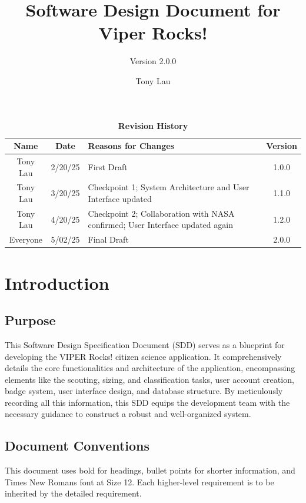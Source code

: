 \documentclass{article}
\begin{document}
\title{Software Design Document for Viper Rocks!}
\author{Version 2.0.0}
\date{Tony Lau}

\maketitle
\tableofcontents
\newpage

\fancyhf{}
\fancyfoot[C]{\thepage}

\begin{table}[h!]
\centering
\caption{\textbf{Revision History}}
\begin{tabularx}{\textwidth}{|c|c|X|c|}
\hline
\textbf{Name} & \textbf{Date} & \textbf{Reasons for Changes} & \textbf{Version} \\
\hline
Tony Lau & 2/20/25 & First Draft & 1.0.0 \\
\hline
Tony Lau & 3/20/25 & Checkpoint 1; System Architecture and User Interface updated & 1.1.0 \\
\hline
Tony Lau & 4/20/25 & Checkpoint 2; Collaboration with NASA confirmed; User Interface updated again & 1.2.0 \\
\hline
Everyone & 5/02/25 & Final Draft & 2.0.0 \\
\hline
\end{tabularx}
\end{table}

\section{Introduction}
\subsection{Purpose}
This Software Design Specification Document (SDD) serves as a blueprint for developing the VIPER Rocks! citizen science application. It comprehensively details the core functionalities and architecture of the application, encompassing elements like the scouting, sizing, and classification tasks, user account creation, badge system, user interface design, and database structure. By meticulously recording all this information, this SDD equips the development team with the necessary guidance to construct a robust and well-organized system.

\subsection{Document Conventions}
This document uses bold for headings, bullet points for shorter information, and Times New Romans font at Size 12. Each higher-level requirement is to be inherited by the detailed requirement.
\end{document}
